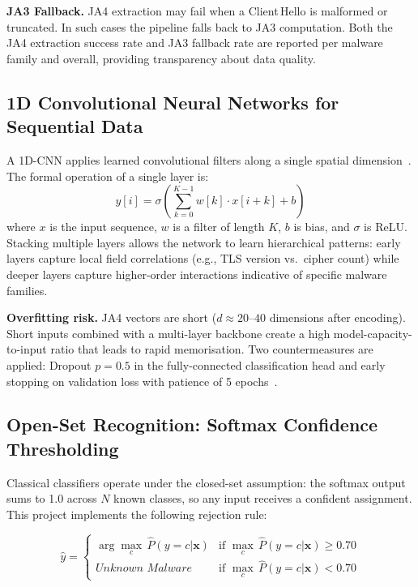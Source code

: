 \documentclass[12pt,a4paper]{report}
\begin{document}
\textbf{JA3 Fallback.} JA4 extraction may fail when a Client\,Hello is malformed
or truncated. In such cases the pipeline falls back to JA3 computation. Both the
JA4 extraction success rate and JA3 fallback rate are reported per malware family
and overall, providing transparency about data quality.

\subsection{1D Convolutional Neural Networks for Sequential Data}

A 1D-CNN applies learned convolutional filters along a single spatial
dimension~\cite{wang2017end}. The formal operation of a single layer is:
\begin{equation}
  y[i] = \sigma\!\left( \sum_{k=0}^{K-1} w[k]\cdot x[i+k] + b \right)
\end{equation}
where $x$ is the input sequence, $w$ is a filter of length $K$, $b$ is bias,
and $\sigma$ is ReLU. Stacking multiple layers allows the network to learn
hierarchical patterns: early layers capture local field correlations (e.g.,
TLS version vs.\ cipher count) while deeper layers capture higher-order
interactions indicative of specific malware families.

\textbf{Overfitting risk.} JA4 vectors are short ($d \approx 20$--$40$
dimensions after encoding). Short inputs combined with a multi-layer backbone
create a high model-capacity-to-input ratio that leads to rapid memorisation.
Two countermeasures are applied: Dropout $p = 0.5$ in the fully-connected
classification head and early stopping on validation loss with patience of
5 epochs~\cite{srivastava2014dropout, prechelt2012early}.

\subsection{Open-Set Recognition: Softmax Confidence Thresholding}

Classical classifiers operate under the closed-set assumption: the softmax output
sums to 1.0 across $N$ known classes, so any input receives a confident assignment.
This project implements the following rejection rule:

\begin{equation}
  \hat{y} =
  \begin{cases}
    \arg\max_c\, \hat{P}(y{=}c|\mathbf{x}) & \text{if } \max_c\, \hat{P}(y{=}c|\mathbf{x}) \geq 0.70 \\
    \textit{Unknown Malware} & \text{if } \max_c\, \hat{P}(y{=}c|\mathbf{x}) < 0.70
  \end{cases}
\end{equation}
\end{document}
